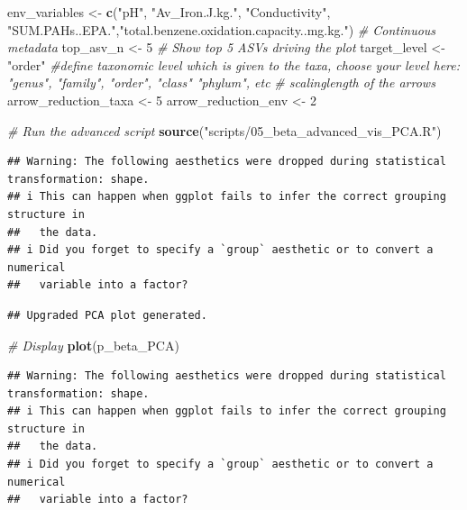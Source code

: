 \documentclass[
]{article}
\newenvironment{Shaded}{\begin{snugshade}}{\end{snugshade}}
\newcommand{\CommentTok}[1]{\textcolor[rgb]{0.56,0.35,0.01}{\textit{#1}}}
\newcommand{\DecValTok}[1]{\textcolor[rgb]{0.00,0.00,0.81}{#1}}
\newcommand{\FunctionTok}[1]{\textcolor[rgb]{0.13,0.29,0.53}{\textbf{#1}}}
\newcommand{\NormalTok}[1]{#1}
\newcommand{\OtherTok}[1]{\textcolor[rgb]{0.56,0.35,0.01}{#1}}
\newcommand{\StringTok}[1]{\textcolor[rgb]{0.31,0.60,0.02}{#1}}
\begin{document}
\begin{Shaded}
\begin{Highlighting}[]
\NormalTok{env\_variables    }\OtherTok{\textless{}{-}} \FunctionTok{c}\NormalTok{(}\StringTok{"pH"}\NormalTok{, }\StringTok{"Av\_Iron.J.kg."}\NormalTok{, }\StringTok{"Conductivity"}\NormalTok{, }\StringTok{"SUM.PAHs..EPA."}\NormalTok{,}\StringTok{"total.benzene.oxidation.capacity..mg.kg."}\NormalTok{) }\CommentTok{\# Continuous metadata}
\NormalTok{top\_asv\_n        }\OtherTok{\textless{}{-}} \DecValTok{5}    \CommentTok{\# Show top 5 ASVs driving the plot}
\NormalTok{target\_level }\OtherTok{\textless{}{-}} \StringTok{"order"} \CommentTok{\#define taxonomic level which is given to the taxa, choose your level here: "genus", "family", "order", "class" "phylum", etc}
\CommentTok{\# scalinglength of the arrows}
\NormalTok{arrow\_reduction\_taxa }\OtherTok{\textless{}{-}} \DecValTok{5}
\NormalTok{arrow\_reduction\_env }\OtherTok{\textless{}{-}} \DecValTok{2}

\CommentTok{\# Run the advanced script}
\FunctionTok{source}\NormalTok{(}\StringTok{"scripts/05\_beta\_advanced\_vis\_PCA.R"}\NormalTok{)}
\end{Highlighting}
\end{Shaded}

\begin{verbatim}
## Warning: The following aesthetics were dropped during statistical transformation: shape.
## i This can happen when ggplot fails to infer the correct grouping structure in
##   the data.
## i Did you forget to specify a `group` aesthetic or to convert a numerical
##   variable into a factor?
\end{verbatim}

\begin{verbatim}
## Upgraded PCA plot generated.
\end{verbatim}

\begin{Shaded}
\begin{Highlighting}[]
\CommentTok{\# Display}
\FunctionTok{plot}\NormalTok{(p\_beta\_PCA)}
\end{Highlighting}
\end{Shaded}

\begin{verbatim}
## Warning: The following aesthetics were dropped during statistical transformation: shape.
## i This can happen when ggplot fails to infer the correct grouping structure in
##   the data.
## i Did you forget to specify a `group` aesthetic or to convert a numerical
##   variable into a factor?
\end{verbatim}
\end{document}
